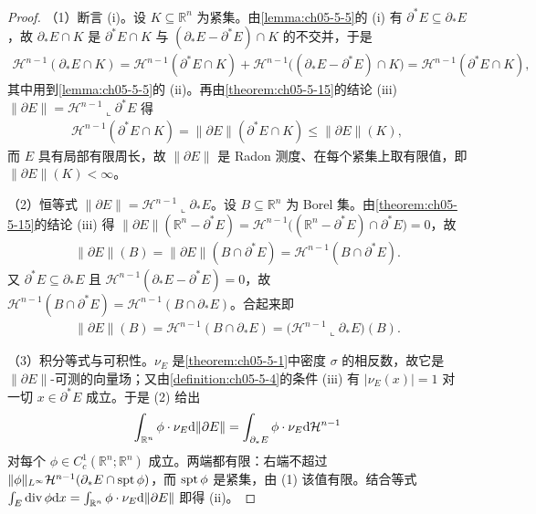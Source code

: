 \documentclass[../../main.tex]{subfiles}%
\begin{document}
\begin{proof}
（1）断言 (i)。设 $K\subseteq\mathbb{R}^n$ 为紧集。由\cref{lemma:ch05-5-5}的 (i) 有 $\partial^*E\subseteq\partial_*E$，故 $\partial_*E\cap K$ 是 $\partial^*E\cap K$ 与 $(\partial_*E-\partial^*E)\cap K$ 的不交并，于是%
\begin{align*}
\mathcal{H}^{n-1}(\partial_*E\cap K)=\mathcal{H}^{n-1}(\partial^*E\cap K)+\mathcal{H}^{n-1}\bigl((\partial_*E-\partial^*E)\cap K\bigr)=\mathcal{H}^{n-1}(\partial^*E\cap K),
\end{align*}
其中用到\cref{lemma:ch05-5-5}的 (ii)。再由\cref{theorem:ch05-5-15}的结论 (iii) $\lVert\partial E\rVert=\mathcal{H}^{n-1}\llcorner\partial^*E$ 得%
\begin{align*}
\mathcal{H}^{n-1}(\partial^*E\cap K)=\lVert\partial E\rVert(\partial^*E\cap K)\leqslant\lVert\partial E\rVert(K),
\end{align*}
而 $E$ 具有局部有限周长，故 $\lVert\partial E\rVert$ 是 Radon 测度、在每个紧集上取有限值，即 $\lVert\partial E\rVert(K)<\infty$。

（2）恒等式 $\lVert\partial E\rVert=\mathcal{H}^{n-1}\llcorner\partial_*E$。设 $B\subseteq\mathbb{R}^n$ 为 Borel 集。由\cref{theorem:ch05-5-15}的结论 (iii) 得 $\lVert\partial E\rVert(\mathbb{R}^n-\partial^*E)=\mathcal{H}^{n-1}\bigl((\mathbb{R}^n-\partial^*E)\cap\partial^*E\bigr)=0$，故%
\begin{align*}
\lVert\partial E\rVert(B)=\lVert\partial E\rVert(B\cap\partial^*E)=\mathcal{H}^{n-1}(B\cap\partial^*E).
\end{align*}
又 $\partial^*E\subseteq\partial_*E$ 且 $\mathcal{H}^{n-1}(\partial_*E-\partial^*E)=0$，故 $\mathcal{H}^{n-1}(B\cap\partial^*E)=\mathcal{H}^{n-1}(B\cap\partial_*E)$。合起来即
\begin{align*}
\lVert\partial E\rVert(B)=\mathcal{H}^{n-1}(B\cap\partial_*E)=\bigl(\mathcal{H}^{n-1}\llcorner\partial_*E\bigr)(B).
\end{align*}

（3）积分等式与可积性。$\nu_E$ 是\cref{theorem:ch05-5-1}中密度 $\sigma$ 的相反数，故它是 $\lVert\partial E\rVert$-可测的向量场；又由\cref{definition:ch05-5-4}的条件 (iii) 有 $\lvert\nu_E(x)\rvert=1$ 对一切 $x\in\partial^*E$ 成立。于是 (2) 给出%
\begin{align*}
\int_{\mathbb{R}^n}\phi\cdot\nu_E\mathrm{d}\lVert\partial E\rVert=\int_{\partial_*E}\phi\cdot\nu_E\mathrm{d}\mathcal{H}^{n-1}
\end{align*}
对每个 $\phi\in C_c^1(\mathbb{R}^n;\mathbb{R}^n)$ 成立。两端都有限：右端不超过 $\lVert\phi\rVert_{L^{\infty}}\mathcal{H}^{n-1}(\partial_*E\cap\operatorname{spt}\phi)$，而 $\operatorname{spt}\phi$ 是紧集，由 (1) 该值有限。结合等式 $\int_E\operatorname{div}\phi\mathrm{d} x=\int_{\mathbb{R}^n}\phi\cdot\nu_E\mathrm{d}\lVert\partial E\rVert$ 即得 (ii)。
\end{proof}
\end{document}
